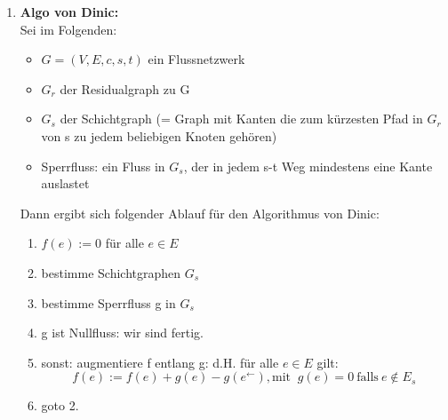 \documentclass[10pt,a4paper]{article}
\begin{document}
    \begin{enumerate}[label={\alph*)}]
        \item \textbf{Algo von Dinic:} \\
            Sei im Folgenden:
            \begin{itemize}
                \item $G = (V,E,c,s,t)$ ein Flussnetzwerk
                \item $G_r$ der Residualgraph zu G
                \item $G_s$ der Schichtgraph (= Graph mit Kanten die zum kürzesten Pfad in $G_r$
                    von s zu jedem beliebigen Knoten gehören)
                \item Sperrfluss: ein Fluss in $G_s$, der in jedem s-t Weg mindestens eine Kante auslastet
                
            \end{itemize}
            
            Dann ergibt sich folgender Ablauf für den Algorithmus von Dinic:
            \begin{enumerate}[label={\arabic*. }]
                \item $f(e) := 0$ für alle $e \in E$
                \item bestimme Schichtgraphen $G_s$
                \item bestimme Sperrfluss g in $G_s$
                \item g ist Nullfluss: wir sind fertig.
                \item sonst: augmentiere f entlang g: d.H. für alle $e \in E$ gilt:
                $$
                    f(e) := f(e) + g(e) - g(e^{\leftarrow}) , \text{mit }\: g(e) = 0 \: \text{falls} \:
                    e \notin E_s
                $$
                \item goto 2.
            \end{enumerate}
            

\end{enumerate}
\end{document}
